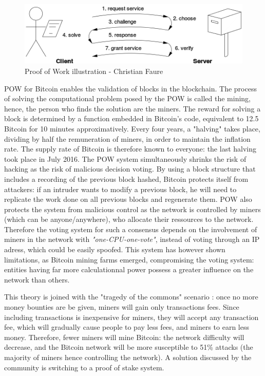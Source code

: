 \documentclass[11pt]{report}
\begin{document}
\medbreak
\begin{figure}[!h]
\centering
\includegraphics{Chap1/Pow}
\caption{Proof of Work illustration - Christian Faure}
\label{POW}
\end{figure}

POW for Bitcoin enables the validation of blocks in the blockchain. The process of solving the computational problem posed by the POW is called the mining, hence, the person who finds the solution are the miners. The reward for solving a block is determined by a function embedded in Bitcoin's code, equivalent to 12.5 Bitcoin for 10 minutes approximatively. Every four years, a "halving" takes place, dividing by half the remuneration of miners, in order to maintain the inflation rate. The supply rate of Bitcoin is therefore known to everyone: the last halving took place in July 2016.\newline
The POW system simultaneously shrinks the risk of hacking as the risk of malicious decision voting. By using a block structure that includes a recording of the previous block hashed, Bitcoin protects itself from attackers: if an intruder wants to modify a previous block, he will need to replicate the work done on all previous blocks and regenerate them. \newline
POW also protects the system from malicious control as the network is controlled by miners (which can be anyone/anywhere), who allocate their ressources to the network. Therefore the voting system for such a consensus depends on the involvement of miners in the network with \textit{"one-CPU-one-vote"}\cite{SATOSHI}, instead of voting through an IP adress, which could be easily spoofed. \newline
This system has however shown limitations, as Bitcoin mining farms emerged, compromising the voting system: entities having far more calculationnal power possess a greater influence on the network than others. \newline

This theory is joined with the "tragedy of the commons" scenario : once no more money bounties are be given, miners will gain only transactions fees. Since including transactions is inexpensive for miners, they will accept any transaction fee, which will gradually cause people to pay less fees, and miners to earn less money. Therefore, fewer miners will mine Bitcoin: the network difficulty will decrease, and the Bitcoin network will be more susceptible to 51\% attacks (the majority of miners hence controlling the network).\newline 
A solution discussed by the community is switching to a proof of stake system.
\end{document}
